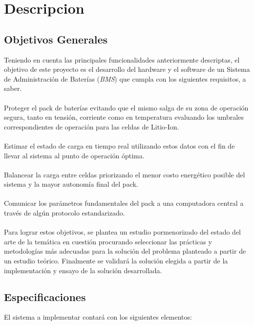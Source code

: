 \documentclass[10pt,a4paper]{article}
\begin{document}
	
	\clearpage
	
	\section{Descripcion}
	
	\subsection{Objetivos Generales}
	
	\noindent Teniendo en cuenta las principales funcionalidades anteriormente descriptas, el objetivo de este proyecto es el desarrollo del hardware y el software de un Sistema de Administración de Baterías (\emph{BMS}) que cumpla con los siguientes requisitos, a saber.\\
	\\
	\noindent Proteger el pack de baterías evitando que el mismo salga de su zona de operación segura, tanto en tensión, corriente como en temperatura evaluando los umbrales correspondientes de operación para las celdas de Litio-Ion.\\
	\\
	\noindent Estimar el estado de carga en tiempo real utilizando estos datos con el fin de llevar al sistema al punto de operación óptima.\\
	\\
	\noindent Balancear la carga entre celdas priorizando el menor costo energético posible del sistema y la mayor autonomía final del pack.\\
	\\
	\noindent Comunicar los parámetros fundamentales del pack a una computadora central a través de algún protocolo estandarizado.\\
	\\
	\noindent Para lograr estos objetivos, se plantea un estudio pormenorizado del estado del arte de la temática en cuestión procurando seleccionar las prácticas y metodologías más adecuadas para la solución del problema planteado a partir de un estudio teórico. Finalmente se validará la solución elegida a partir de la implementación y ensayo de la solución desarrollada.
	
	\subsection{Especificaciones}
	
	El sistema a implementar  contará con los siguientes elementos:
	
\end{document}
